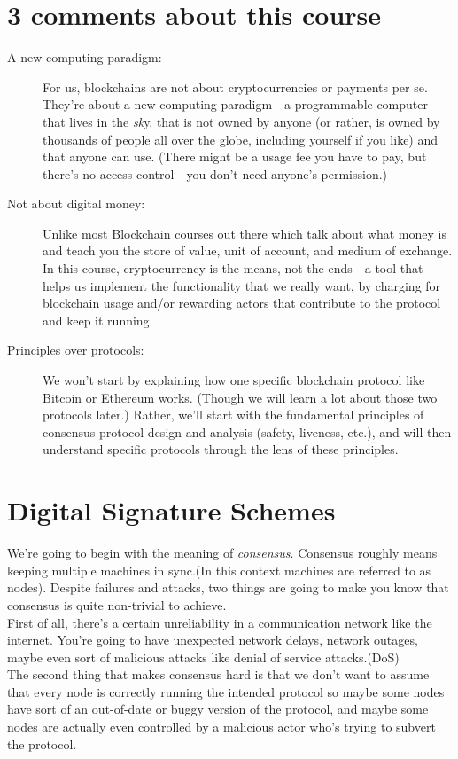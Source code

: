 \section{3 comments about this course}
\begin{description}
    \item[A new computing paradigm:] For us, blockchains are not about cryptocurrencies or
payments per se. They’re about a new computing paradigm—a programmable computer
that lives in the \textit{sk}y, that is not owned by anyone (or rather, is owned by thousands of
people all over the globe, including yourself if you like) and that anyone can use. (There
might be a usage fee you have to pay, but there’s no access control—you don’t need anyone’s
permission.)

    \item[Not about digital money:] Unlike most Blockchain courses out there which talk about what money is and teach you the store of value, unit of account, and medium of exchange. In this course, cryptocurrency is the means, not the ends—a tool that
helps us implement the functionality that we really want, by charging for blockchain usage and/or rewarding actors that contribute to the protocol and keep it running.

    \item[Principles over protocols:] We won’t start by explaining how one specific blockchain
protocol like Bitcoin or Ethereum works. (Though we will learn a lot about those two
protocols later.) Rather, we’ll start with the fundamental principles of consensus protocol
design and analysis (safety, liveness, etc.), and will then understand specific protocols through
the lens of these principles.

\end{description}


\section{Digital Signature Schemes}
We're going to begin with the meaning of \textit{consensus}.
Consensus roughly means keeping multiple machines in sync.(In this context machines are referred to as nodes). Despite failures
and attacks, two things are
going to make you know that consensus is quite
non-trivial to achieve. \\
First of
all, there's a certain unreliability in a
communication network like the internet. You're going to have unexpected
network delays, network outages,
maybe even sort of malicious attacks
like denial of service attacks.(DoS)\\
The second thing that makes consensus
hard is that we don't want to assume that
every node is correctly running the
intended protocol so maybe some nodes
have sort of an out-of-date or buggy
version of the protocol, and maybe some nodes
are actually even controlled by a
malicious actor who's trying to subvert
the protocol.\\

